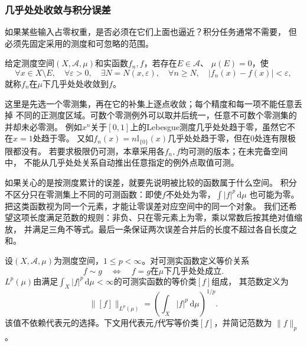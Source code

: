 \subsubsection{几乎处处收敛与积分误差}

如果某些输入占零权重，是否必须在它们上面也逼近？积分任务通常不需要，
但必须先固定采用的测度和可忽略的范围。
\begin{definition}[几乎处处收敛]
\label{def:analysis-almost-everywhere-convergence}
给定测度空间$(X,\mathcal A,\mu)$和实函数$f_n,f$，若存在$E\in\mathcal A$、
$\mu(E)=0$，使
\[
 \forall x\in X\setminus E,\quad
 \forall\varepsilon>0,\quad
 \exists N=N(x,\varepsilon),\quad
 \forall n\geq N,\quad |f_n(x)-f(x)|<\varepsilon,
\]
就称$f_n$在$\mu$下几乎处处收敛到$f$。
\end{definition}
这里是先选一个零测集，再在它的补集上逐点收敛；每个精度和每一项不能任意丢掉
不同的正测度区域。可数个零测例外可以取并后统一，任意不可数个零测集的并却未必零测。
例如$x^n$关于$[0,1]$上的Lebesgue测度几乎处处趋于零，虽然它不在$x=1$处趋于零。
又如$f_n(x)=n\mathbb I_{\{0\}}(x)$几乎处处趋于零，但在$0$处连有限极限都没有。
若要求极限仍可测，本章采用各$f_n,f$均可测的版本；在未完备空间中，
不能从几乎处处关系自动推出任意指定的例外点取值可测。

如果关心的是按测度累计的误差，就要先说明被比较的函数属于什么空间。
积分不区分只在零测集上不同的可测函数：即使$f$不处处为零，$\int|f|^p\,\mathrm d\mu$
也可能为零。把这类函数视为同一个元素，才能让零误差对应空间中的同一个对象。
我们还希望这项长度满足范数的规则：非负、只在零元素上为零，乘以常数后按其绝对值缩放，
并满足三角不等式。最后一条保证两次误差合并后的长度不超过各自长度之和。
\begin{definition}[$L^p$空间与范数]
\label{def:analysis-lp-space}
设$(X,\mathcal A,\mu)$为测度空间，$1\leq p<\infty$。对可测实函数定义等价关系
\[
  f\sim g\quad\Longleftrightarrow\quad f=g\text{在$\mu$下几乎处处成立}.
\]
$L^p(\mu)$由满足$\int_X|f|^p\,\mathrm d\mu<\infty$的可测实函数的等价类$[f]$组成，
其范数定义为
\[
  \lVert[f]\rVert_{L^p(\mu)}
  =\left(\int_X|f|^p\,\mathrm d\mu\right)^{1/p}.
\]
该值不依赖代表元的选择。下文用代表元$f$代写等价类$[f]$，并简记范数为
$\lVert f\rVert_p$。
\end{definition}

